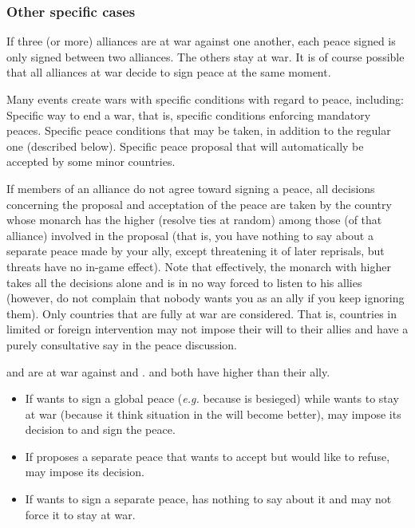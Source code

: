\subsubsection{Other specific cases}
\bparag If three (or more) alliances are at war against one another, each
peace signed is only signed between two alliances. The others stay at war.
\bparag It is of course possible that all alliances at war decide to sign
peace at the same moment.

 Many events create wars with specific conditions
with regard to peace, including:
\bparag Specific way to end a war, that is, specific conditions enforcing
mandatory peaces.
\bparag Specific peace conditions that may be taken, in addition to the
regular one (described below).
\bparag Specific peace proposal that will automatically be accepted by some
minor countries.

\aparag[Disagreements]
\bparag If members of an alliance do not agree toward signing a peace, all
decisions concerning the proposal and acceptation of the peace are taken by
the country whose monarch has the higher \DIP (resolve ties at random) among
those (of that alliance) involved in the proposal (that is, you have nothing
to say about a separate peace made by your ally, except threatening it of
later reprisals, but threats have no in-game effect).
\bparag Note that effectively, the monarch with higher \DIP takes all the
decisions alone and is in no way forced to listen to his allies (however, do
not complain that nobody wants you as an ally if you keep ignoring them).
\bparag Only countries that are fully at war are considered. That is,
countries in limited or foreign intervention may not impose their will to
their allies and have a purely consultative say in the peace discussion. 

\begin{exemple}[Disagreements]
  \FRA and \SPA are at war against \HOL and \ANG. \FRA and  \HOL both have
  higher \DIP than their ally.
  \begin{itemize}
  \item If \HOL wants to sign a global peace (\emph{e.g.} because
    \villeAmsterdam is besieged) while \ANG wants to stay at war (because it
    think situation in the \ROTW will become better), \HOL may impose its
    decision to \ANG and sign the peace.
  \item If \HOL proposes a separate peace that \FRA wants to accept but \HIS
    would like to refuse, \FRA may impose its decision.
  \item If \ANG wants to sign a separate peace, \HOL has nothing to say about
    it and may not force it to stay at war.
  \end{itemize}
\end{exemple}

